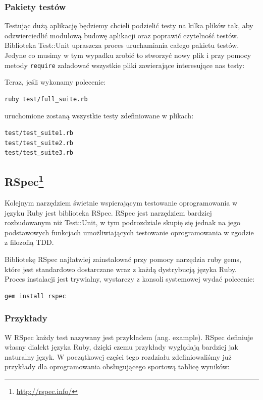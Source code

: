     \subsubsection{Pakiety testów}
    Testując dużą aplikację będziemy chcieli podzielić testy na kilka plików tak, aby odzwierciedlić modułową budowę aplikacji oraz poprawić czytelność testów. Biblioteka Test::Unit upraszcza proces uruchamiania całego pakietu testów. Jedyne co musimy w tym wypadku zrobić to stworzyć nowy plik i przy pomocy metody \verb+require+ załadować wszystkie pliki zawierające interesujące nas testy:
    
    
    
    Teraz, jeśli wykonamy polecenie:
    
\begin{lstlisting} 
ruby test/full_suite.rb
\end{lstlisting}
    
    uruchomione zostaną wszystkie testy zdefiniowane w plikach:
    
\begin{lstlisting} 
test/test_suite1.rb
test/test_suite2.rb
test/test_suite3.rb
\end{lstlisting}
    
    \subsection[RSpec]{RSpec\footnote{\url{http://rspec.info/}\nocite{rspec}}}
    
    Kolejnym narzędziem świetnie wspierającym testowanie oprogramowania w języku Ruby jest biblioteka RSpec. RSpec jest narzędziem bardziej rozbudowanym niż Test::Unit, w tym podrozdziale skupię się jednak na jego podstawowych funkcjach umożliwiających testowanie oprogramowania w zgodzie z filozofią TDD.
    
    Bibliotekę RSpec najłatwiej zainstalować przy pomocy narzędzia ruby gems, które jest standardowo dostarczane wraz z każdą dystrybucją języka Ruby. Proces instalacji jest trywialny, wystarczy z konsoli systemowej wydać polecenie:
    
\begin{lstlisting}
gem install rspec
\end{lstlisting}
    
    \subsubsection{Przykłady}
    W RSpec każdy test nazywany jest przykładem (ang. example). RSpec definiuje własny dialekt języka Ruby, dzięki czemu przykłady wyglądają bardziej jak naturalny język. W początkowej części tego rozdziału zdefiniowaliśmy już przykłady dla oprogramowania obsługującego sportową tablicę wyników:
    
